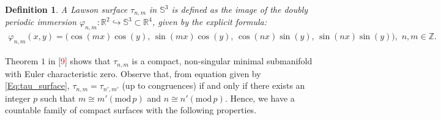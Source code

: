 \documentclass[reqno,11pt]{amsart}
\newtheorem{definition}[theorem]{Definition}
\begin{document}

\begin{definition}
    A Lawson surface $\tau_{n,m}$ in $\mathbb{S}^3$  is defined as the image of the doubly periodic immersion $\varphi_{n,m}: \mathbb{R}^2 \hookrightarrow \mathbb{S}^3 \subset \mathbb{R}^4$, given by the explicit formula:
    \begin{eqnarray}\label{Eq:tau_surface}
    \varphi_{n,m}(x, y) = \big(\cos(mx)\cos(y),\,\sin(mx) \cos(y),\, \cos(nx) \sin(y),\, \sin(nx) \sin(y)\big),\,\, n,m \in \mathbb{Z}.     
    \end{eqnarray}
\end{definition}

\noindent Theorem $1$ in [\textcolor{red}{9}] shows that $\tau_{n,m}$ is a compact, non-singular minimal submanifold with Euler characteristic zero. Observe that, from equation given by \eqref{Eq:tau_surface}, $\tau_{n,m} = \tau_{n',m'}$ (up to congruences) if and only if there exists an integer $p$ such that $m \cong m' (\mbox{mod} \, p)$ and $n \cong n'(\mbox{mod} \, p)$. Hence, we have a countable family of compact surfaces with the following properties.
\end{document}
